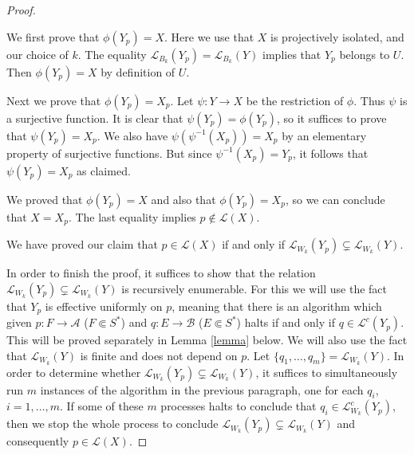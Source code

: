 \documentclass[10pt,a4paper]{amsart}
\newcommand{\A}{\mathcal{A}}
\newcommand{\B}{\mathcal{B}}
\newcommand{\Le}{\mathcal{L}}
\newcommand{\Lep}{\mathscr{L}}
\begin{document}
\begin{proof}
\begin{itemize}
        We first prove that $\phi(Y_p)=X$. Here we use that $X$ is projectively isolated, and our choice of $k$. The equality $\Le_{B_k}(Y_p)=\Le_{B_k}(Y)$ implies that $Y_p$ belongs to $U$. Then $\phi(Y_p)=X$ by definition of $U$. 
        
        Next we prove that $\phi(Y_p)=X_p$. Let $\psi\colon Y\to X$ be the restriction of $\phi$. Thus $\psi$ is a surjective function. It is clear that $\psi(Y_p)=\phi(Y_p)$, so it suffices to prove that $\psi(Y_p)=X_p$. We also have $\psi(\psi^{-1}(X_p))=X_p$ by an elementary property of surjective functions. But since $\psi^{-1}(X_p)=Y_p$, it follows that $\psi(Y_p)=X_p$ as claimed.   
        
        We proved that $\phi(Y_p)=X$ and also that $\phi(Y_p)=X_p$, so we can conclude that $X=X_p$. The last equality implies $p\not\in\Lep(X)$.
    \end{itemize} 
    We have proved our claim that $p\in\Lep(X)$ if and only if $\Lep_{W_k}(Y_p)\subsetneq\Lep_{W_k}(Y)$.
    
    In order to finish the proof, it suffices to show that the relation $\Lep_{W_k}(Y_p)\subsetneq\Lep_{W_k}(Y)$ is recursively enumerable. For this we will use the fact that $Y_p$ is effective uniformly on $p$, meaning that there is an algorithm which given $p\colon F\to \A$ ($F\Subset S^\ast$) and $q\colon E\to \B$ ($E\Subset S^\ast$) halts if and only if $q\in \Lep^c(Y_p)$. This will be proved separately in Lemma \ref{lemma} below. We will also use the fact that $\Lep_{W_k}(Y)$ is finite and does not depend on $p$. Let $\{q_1,\dots,q_m\}=\Lep_{W_k}(Y)$. In order to determine whether $\Lep_{W_k}(Y_p)\subsetneq\Lep_{W_k}(Y)$, it suffices to simultaneously run $m$ instances of the algorithm in the previous paragraph, one for each $q_i$, $i=1,\dots,m$. If some of these $m$ processes halts to conclude that $q_i\in\Lep^c_{W_k}(Y_p)$, then we stop the whole process to conclude $\Lep_{W_k}(Y_p)\subsetneq\Lep_{W_k}(Y)$ and consequently $p\in\Lep(X)$. \end{proof}
\end{document}
